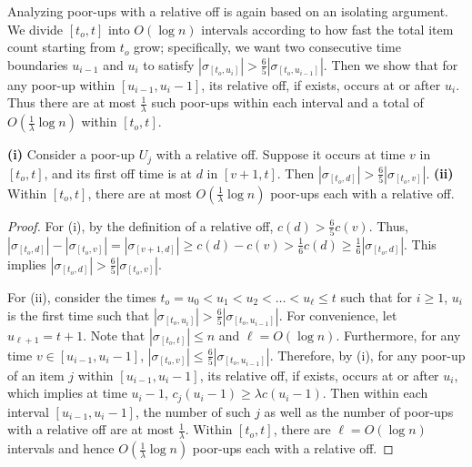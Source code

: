 \documentclass[proceedings]{stacs}
\theoremstyle{definition}\newtheorem{fact}{Fact}
\newcommand{\ns}{c}
\newcommand{\cjs}{c_{j}}
\begin{document}
Analyzing poor-ups with a relative off is again based
on an isolating argument.
We divide $[t_o,t]$ into $O(\log n)$ intervals
according to how fast the total item count starting from $t_o$ grow;
specifically, we want two consecutive time boundaries $u_{i-1}$ and $u_i$
to satisfy $|\sigma_{[t_o, u_i]} | > \frac{6}{5} | \sigma_{[t_o, u_{i-1}]} |$.
Then we  show that for any poor-up  within $[u_{i-1},u_i - 1]$,
its relative off, if exists, occurs
at or after $u_i$.  Thus
there are at most $\frac{1}{\lambda}$ such poor-ups within each interval
and a total of $O(\frac{1}{\lambda}  \log n)$ within $[t_o,t]$.

\begin{lemma}\label{lem:fi-type2}
{\bf (i)} Consider a poor-up $U_j$ with a relative off.  Suppose it occurs at time $v$
in $[t_o,t]$, and its first off time is at $d$ in $[v+1,t]$.
Then $|\sigma_{[t_o, d]}| > \frac{6}{5}| \sigma_{[t_o, v]} |$.
{\bf (ii)} Within $[t_o,t]$, there are at most $O( \frac{1}{\lambda}
\log n)$ poor-ups each with a relative off.
\end{lemma}

\begin{proof}
For (i), by the definition of a relative off,
$\ns(d) > \frac{6}{5}\ns(v)$.
Thus,
$|\sigma_{[t_o, d]} | - | \sigma_{[t_o, v]} |
= | \sigma_{[v+1, d]} |
\ge \ns(d) - \ns(v) > \frac{1}{6} \ns(d)
\ge \frac{1}{6}| \sigma_{[t_o, d]}|$.
This implies
$|\sigma_{[t_o, d]}| > \frac{6}{5}| \sigma_{[t_o, v]} |$.

For (ii), consider the times $t_o = u_0 < u_1 < u_2 < \dots< u_\ell \le t$
such that for $i \ge 1$,
$u_i$ is the first time such that
$|\sigma_{[t_o, u_i]} | > \frac{6}{5} | \sigma_{[t_o, u_{i-1}]} |$.
For convenience, let $u_{\ell + 1} = t + 1$.
Note that $| \sigma_{[t_o, t]} | \le n$ and $\ell = O(\log n)$.
Furthermore, for any time $v \in [u_{i-1}, u_i - 1]$,
$| \sigma_{[t_o, v]} | \le \frac{6}{5} |\sigma_{[t_o, u_{i-1}]} |$.
Therefore, by (i),
for any poor-up of an item $j$ within $[u_{i-1}, u_i - 1]$,
its relative off, if exists, occurs at or after $u_i$,
which implies
at time $u_i - 1$, $\cjs(u_i-1) \ge \lambda \ns (u_i - 1)$.
Then within each interval $[u_{i-1}, u_i - 1]$,
the number of such $j$ as well as the number of poor-ups with a relative off
are at most $\frac{1}{\lambda}$.
Within $[t_o, t]$, there are $\ell = O( \log n)$ intervals
and hence $O( \frac{1}{\lambda} \log n)$
poor-ups each with a relative off.
\end{proof}
\end{document}
